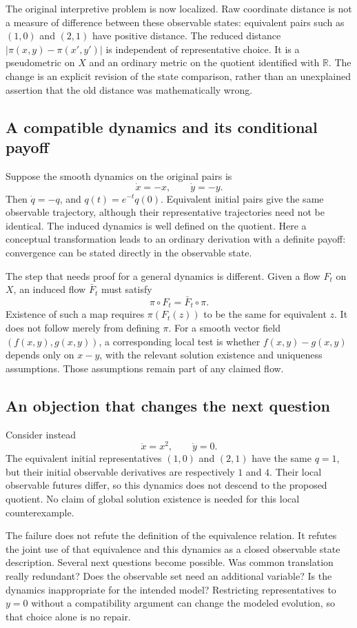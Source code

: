 The original interpretive problem is now localized. Raw coordinate distance is
not a measure of difference between these observable states: equivalent pairs
such as $(1,0)$ and $(2,1)$ have positive distance. The reduced distance
$|\pi(x,y)-\pi(x',y')|$ is independent of representative choice. It is a
pseudometric on $X$ and an ordinary metric on the quotient identified with
$\mathbb{R}$. The change is an explicit revision of the state comparison, rather
than an unexplained assertion that the old distance was mathematically wrong.

\subsection{A compatible dynamics and its conditional payoff}
Suppose the smooth dynamics on the original pairs is
\[
 \dot x=-x,\qquad \dot y=-y.
\]
Then $\dot q=-q$, and $q(t)=e^{-t}q(0)$. Equivalent initial pairs give the same
observable trajectory, although their representative trajectories need not be
identical. The induced dynamics is well defined on the quotient. Here a
conceptual transformation leads to an ordinary derivation with a definite
payoff: convergence can be stated directly in the observable state.

The step that needs proof for a general dynamics is different. Given a flow
$F_t$ on $X$, an induced flow $\bar F_t$ must satisfy
\[
 \pi\circ F_t=\bar F_t\circ\pi.
\]
Existence of such a map requires $\pi(F_t(z))$ to be the same for equivalent
$z$. It does not follow merely from defining $\pi$. For a smooth vector field
$(f(x,y),g(x,y))$, a corresponding local test is whether
$f(x,y)-g(x,y)$ depends only on $x-y$, with the relevant solution existence and
uniqueness assumptions. Those assumptions remain part of any claimed flow.

\subsection{An objection that changes the next question}
Consider instead
\[
 \dot x=x^2,\qquad \dot y=0.
\]
The equivalent initial representatives $(1,0)$ and $(2,1)$ have the same $q=1$,
but their initial observable derivatives are respectively $1$ and $4$. Their
local observable futures differ, so this dynamics does not descend to the
proposed quotient. No claim of global solution existence is needed for this
local counterexample.

The failure does not refute the definition of the equivalence relation. It
refutes the joint use of that equivalence and this dynamics as a closed observable
state description. Several next questions become possible. Was common translation
really redundant? Does the observable set need an additional variable? Is the
dynamics inappropriate for the intended model? Restricting representatives to
$y=0$ without a compatibility argument can change the modeled evolution, so that
choice alone is no repair.

